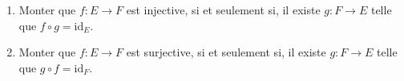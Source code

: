 
\begin{enumerate}

\item Monter que $f : E \rightarrow F$ est injective, si et seulement si, il existe $g : F \rightarrow E$ telle que $f \circ g = \text{id}_E$.

\item Monter que $f : E \rightarrow F$ est surjective, si et seulement si, il existe $g : F \rightarrow E$ telle que $g \circ f = \text{id}_F$.

\end{enumerate}



